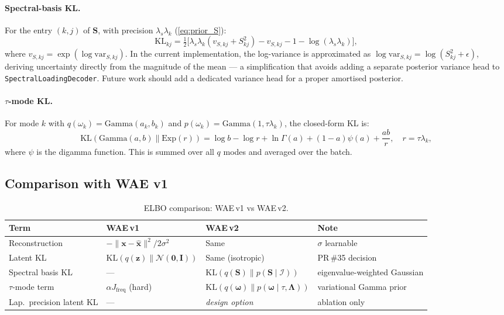 \documentclass[11pt,a4paper]{article}
\newcommand{\KL}{\mathrm{KL}}
\newcommand{\N}{\mathcal{N}}
\newcommand{\I}{\mathcal{I}}
\newcommand{\bLambda}{\bm{\Lambda}}
\newcommand{\bS}{\bm{S}}
\newcommand{\bz}{\bm{z}}
\newcommand{\bomega}{\bm{\omega}}
\newcommand{\bx}{\bm{x}}
\begin{document}
\paragraph{Spectral-basis KL.}
For the entry $(k,j)$ of $\bS$, with precision $\lambda_s\lambda_k$
(\cref{eq:prior_S}):
\begin{equation}
  \KL_{kj} = \tfrac{1}{2}\bigl[
    \lambda_s\lambda_k(v_{S,kj} + S_{kj}^2)
    - v_{S,kj} - 1 - \log(\lambda_s\lambda_k)
  \bigr],
  \label{eq:kl_S}
\end{equation}
where $v_{S,kj} = \exp(\log\mathrm{var}_{S,kj})$.  In the current
implementation, the log-variance is approximated as
$\log\mathrm{var}_{S,kj} = \log(S_{kj}^2 + \epsilon)$, deriving uncertainty
directly from the magnitude of the mean --- a simplification that avoids adding
a separate posterior variance head to \texttt{SpectralLoadingDecoder}.  Future
work should add a dedicated variance head for a proper amortised posterior.

\paragraph{$\tau$-mode KL.}
For mode $k$ with $q(\omega_k)=\mathrm{Gamma}(a_k, b_k)$ and
$p(\omega_k)=\mathrm{Gamma}(1, \tau\lambda_k)$, the closed-form KL is:
\begin{equation}
  \KL(\mathrm{Gamma}(a,b)\|\mathrm{Exp}(r)) =
  \log b - \log r + \ln\Gamma(a) + (1-a)\psi(a) + \frac{ab}{r},
  \quad r = \tau\lambda_k,
  \label{eq:kl_tau}
\end{equation}
where $\psi$ is the digamma function.  This is summed over all $q$ modes and
averaged over the batch.

\subsection{Comparison with WAE v1}

\begin{table}[h]
\centering
\caption{ELBO comparison: WAE\,v1 vs WAE\,v2.}
\label{tab:elbo_comparison}
\begin{tabular}{@{}llll@{}}
\toprule
Term & WAE\,v1 & WAE\,v2 & Note \\
\midrule
Reconstruction & $-\|\bx-\hat{\bx}\|^2/2\sigma^2$ & Same & $\sigma$ learnable \\
Latent KL & $\KL(q(\bz)\|\N(\mathbf{0},\bm{I}))$ & Same (isotropic) & PR\,\#35 decision \\
Spectral basis KL & --- & $\KL(q(\bS)\|p(\bS\mid\I))$ & eigenvalue-weighted Gaussian \\
$\tau$-mode term & $\alpha J_{\mathrm{freq}}$ (hard) & $\KL(q(\bomega)\|p(\bomega\mid\tau,\bLambda))$ & variational Gamma prior \\
Lap.~precision latent KL & --- & \emph{design option} & ablation only \\
\bottomrule
\end{tabular}
\end{table}
\end{document}
